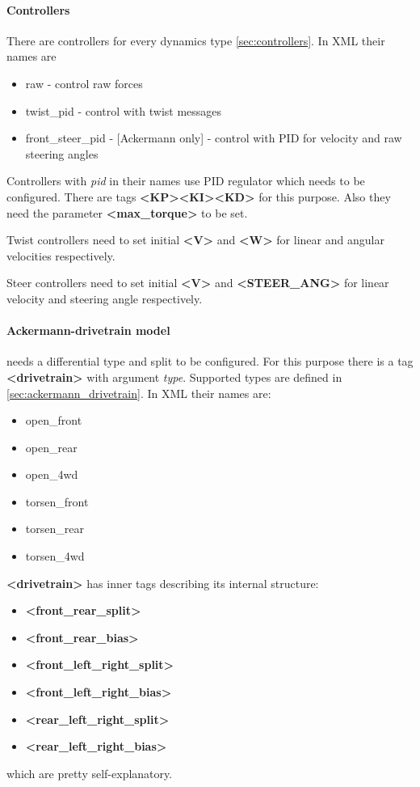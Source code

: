 \documentclass[a4paper,11pt]{article}
\begin{document}
\paragraph{Controllers}
There are controllers for every dynamics type \ref{sec:controllers}.
In XML their names are
\begin{itemize}
	\item raw - control raw forces
	\item twist\_pid - control with twist messages
	\item front\_steer\_pid - [Ackermann only] - control with PID for velocity and raw steering angles
\end{itemize}

Controllers with \textit{pid} in their names use PID regulator which needs to be configured.
There are tags \textbf{\textless KP\textgreater}\textbf{\textless KI\textgreater}\textbf{\textless KD\textgreater} for this purpose. Also they need the parameter \textbf{\textless max\_torque\textgreater} to be set.

Twist controllers need to set initial \textbf{\textless V\textgreater} and \textbf{\textless W\textgreater} for linear and angular velocities respectively.

Steer controllers need to set initial \textbf{\textless V\textgreater} and \textbf{\textless STEER\_ANG\textgreater} for linear velocity and steering angle respectively.

\paragraph{Ackermann-drivetrain model} needs a differential type and split to be configured. For this purpose there is a tag \textbf{\textless drivetrain\textgreater} with argument \textit{type}.
Supported types are defined in \ref{sec:ackermann_drivetrain}. In XML their names are:
\begin{itemize}
	\item open\_front
	\item open\_rear
	\item open\_4wd
	\item torsen\_front
	\item torsen\_rear
	\item torsen\_4wd
\end{itemize}

\textbf{\textless drivetrain\textgreater} has inner tags describing its internal structure:
\begin{itemize}
	\item \textbf{\textless front\_rear\_split\textgreater}
	\item \textbf{\textless front\_rear\_bias\textgreater}
	\item \textbf{\textless front\_left\_right\_split\textgreater}
	\item \textbf{\textless front\_left\_right\_bias\textgreater}
	\item \textbf{\textless rear\_left\_right\_split\textgreater}
	\item \textbf{\textless rear\_left\_right\_bias\textgreater}
\end{itemize}
which are pretty self-explanatory.
\end{document}
